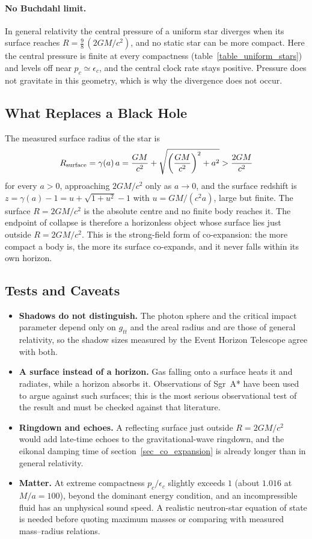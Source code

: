 \paragraph{No Buchdahl limit.} In general relativity the central pressure of a uniform star diverges when its surface reaches $R=\tfrac98\,(2GM/c^2)$, and no static star can be more compact. Here the central pressure is finite at every compactness (table~\ref{table_uniform_stars}) and levels off near $p_c\simeq\epsilon_c$, and the central clock rate stays positive. Pressure does not gravitate in this geometry, which is why the divergence does not occur.

\subsection{What Replaces a Black Hole}

The measured surface radius of the star is
\begin{equation}\label{eq_surface_radius}
    R_{\rm surface}=\gamma(a)\,a=\frac{GM}{c^2}+\sqrt{\left(\frac{GM}{c^2}\right)^2+a^2}>\frac{2GM}{c^2}
\end{equation}
for every $a>0$, approaching $2GM/c^2$ only as $a\to0$, and the surface redshift is $z=\gamma(a)-1=u+\sqrt{1+u^2}-1$ with $u=GM/(c^2a)$, large but finite. The surface $R=2GM/c^2$ is the absolute centre and no finite body reaches it. The endpoint of collapse is therefore a horizonless object whose surface lies just outside $R=2GM/c^2$. This is the strong-field form of co-expansion: the more compact a body is, the more its surface co-expands, and it never falls within its own horizon.

\subsection{Tests and Caveats}

\begin{itemize}
    \item \textbf{Shadows do not distinguish.} The photon sphere and the critical impact parameter depend only on $g_{tt}$ and the areal radius and are those of general relativity, so the shadow sizes measured by the Event Horizon Telescope agree with both.
    \item \textbf{A surface instead of a horizon.} Gas falling onto a surface heats it and radiates, while a horizon absorbs it. Observations of Sgr~A* have been used to argue against such surfaces; this is the most serious observational test of the result and must be checked against that literature.
    \item \textbf{Ringdown and echoes.} A reflecting surface just outside $R=2GM/c^2$ would add late-time echoes to the gravitational-wave ringdown, and the eikonal damping time of section~\ref{sec_co_expansion} is already longer than in general relativity.
    \item \textbf{Matter.} At extreme compactness $p_c/\epsilon_c$ slightly exceeds $1$ (about $1.016$ at $M/a=100$), beyond the dominant energy condition, and an incompressible fluid has an unphysical sound speed. A realistic neutron-star equation of state is needed before quoting maximum masses or comparing with measured mass--radius relations.
\end{itemize}
